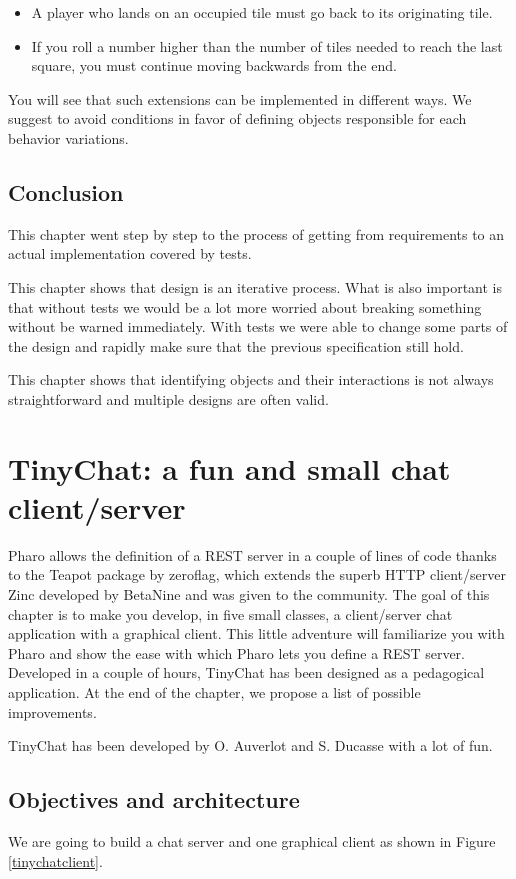 \documentclass[10pt,twoside,english]{_support/latex/sbabook/sbabook}
\begin{document}
\begin{itemize}
\item A player who lands on an occupied tile must go back to its originating tile.
\item If you roll a number higher than the number of tiles needed to reach the last square, you must continue moving backwards from the end. 
\end{itemize}

You will see that such extensions can be implemented in different ways. We suggest to avoid conditions in favor of defining objects responsible for each behavior variations.
\section{Conclusion}
This chapter went step by step to the process of getting from requirements to an actual implementation covered by tests. 

This chapter shows that design is an iterative process. What is also important is that without tests we would be a lot more worried about breaking something without be warned immediately.
With tests we were able to change some parts of the design and rapidly make sure that the
previous specification still hold.

This chapter shows that identifying objects and their interactions is not always straightforward and multiple designs are often valid. 


\chapter{TinyChat: a fun and small chat client/server}
Pharo allows the definition of a REST server in a couple of lines of code thanks to the Teapot package by zeroflag, which extends the superb HTTP client/server Zinc developed by BetaNine and was given to the community. 
The goal of this chapter is to make you develop, in five small classes, a client/server chat application with a graphical client.
This little adventure will familiarize you with Pharo and show the ease with which Pharo lets you define a REST server.
Developed in a couple of hours, TinyChat has been designed as a pedagogical application. At the end of the chapter, we propose a list of possible improvements. 

TinyChat has been developed by O. Auverlot and S. Ducasse with a lot of fun. 
\section{Objectives and architecture}
We are going to build a chat server and one graphical client as shown in Figure \ref{tinychatclient}. 
\end{document}
